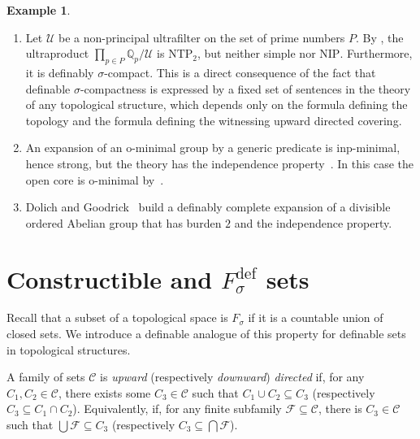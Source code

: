 \documentclass[12pt]{article}
\newcommand{\Cc}{\mathcal{C}}
\newcommand{\Ff}{\mathcal{F}}
\newcommand{\Uu}{\mathcal{U}}
\newcommand{\dF}{\ensuremath{F_\sigma^{\text{def}}}}
\newcommand{\Q}{\mathbb{Q}}
\newcommand{\NIP}{\ensuremath{\mathrm{NIP}}}
\newcommand{\NTP}{\ensuremath{\mathrm{NTP}_2}}
\theoremstyle{definition}
\newtheorem{example}[theorem]{Example}
\theoremstyle{remark}
\begin{document}
\begin{example}
\begin{enumerate}
    \item Let $\Uu$ be a non-principal ultrafilter on the set of prime numbers $P$. By \cite[Example 1.2]{ntp2-groups-fields}, the ultraproduct $\prod_{p\in P} \Q_p/\Uu$ is $\NTP$, but neither simple nor $\NIP$. Furthermore, it is definably $\sigma$-compact. This is a direct consequence of the fact that definable $\sigma$-compactness is expressed by a fixed set of sentences in the theory of any topological structure, which depends only on the formula defining the topology and the formula defining the witnessing upward directed covering. 

    \item An expansion of an o-minimal group by a generic predicate is inp-minimal, hence strong, but the theory has the independence property~\cite[Section 3.4]{DG17}. In this case the open core is o-minimal by~\cite{DMS10}.
    
    \item Dolich and Goodrick~\cite[Section 3]{DG-burden2} build a definably complete expansion of a divisible ordered Abelian group that has burden $2$ and the independence property. 
\end{enumerate}    
\end{example}

\section{Constructible and $\dF$ sets} \label{sec:cons-df}

Recall that a subset of a topological space is $F_\sigma$ if it is a countable union of closed sets. We introduce a definable analogue of this property for definable sets in topological structures. 


A family of sets $\Cc$ is \emph{upward} (respectively \emph{downward}) \emph{directed} if, for any $C_1, C_2 \in \Cc$, there exists some $C_3\in \Cc$ such that $C_1 \cup C_2 \subseteq C_3$ (respectively $C_3 \subseteq C_1 \cap C_2$). Equivalently, if, for any finite subfamily $\Ff\subseteq \Cc$, there is $C_3\in \Cc$ such that $\bigcup \Ff \subseteq C_3$ (respectively $C_3\subseteq \bigcap\Ff$).
\end{document}
